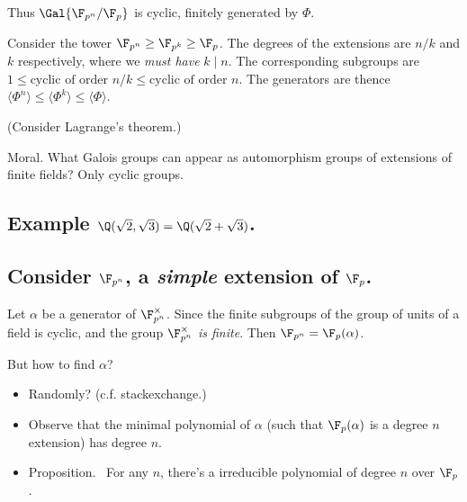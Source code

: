 Thus \(\Gal{\F_{p^n}/\F_p}\) is cyclic, finitely generated by
\(\Phi\).

Consider the tower \(\F_{p^n} \ge \F_{p^k} \ge \F_p\). The degrees of
the extensions are \(n/k\) and \(k\) respectively, where we \emph{must
have} \(k \mid n\). The corresponding subgroups are
\(1 \le \text{cyclic of order $n/k$} \le \text{cyclic of order $n$}\).
The generators are thence
\(\langle \Phi^n\rangle \le \langle \Phi^k \rangle \le \langle \Phi \rangle\).

\pf (Consider Lagrange's theorem.)

Moral. What Galois groups can appear as automorphism groups of
extensions of finite fields? Only cyclic groups.

\hypertarget{example-qqsqrt2-sqrt3-qqsqrt2-sqrt3.}{%
\subsection{\texorpdfstring{Example
\(\Q(\sqrt{2}, \sqrt{3}) = \Q(\sqrt{2} + \sqrt{3})\).}{Example \textbackslash Q(\textbackslash sqrt\{2\}, \textbackslash sqrt\{3\}) = \textbackslash Q(\textbackslash sqrt\{2\} + \textbackslash sqrt\{3\}).}}\label{example-qqsqrt2-sqrt3-qqsqrt2-sqrt3.}}

\hypertarget{consider-ff_pn-a-simple-extension-of-ff_p.}{%
\subsection{\texorpdfstring{Consider \(\F_{p^n}\), a \emph{simple
}extension of
\(\F_p\).}{Consider \textbackslash F\_\{p\^{}n\}, a simple extension of \textbackslash F\_p.}}\label{consider-ff_pn-a-simple-extension-of-ff_p.}}

\pf Let \(\alpha\) be a generator of \(\F_{p^n}^\times\). Since the
finite subgroups of the group of units of a field is cyclic, and the
group \(\F_{p^n}^\times\) \emph{is finite}. Then
\(\F_{p^n} = \F_p(\alpha)\).

But how to find \(\alpha\)?

\begin{itemize}
\item
  Randomly? (c.f. stackexchange.)
\item
  Observe that the minimal polynomial of \(\alpha\) (such that
  \(\F_p(\alpha)\) is a degree \(n\) extension) has degree \(n\).
\item
  Proposition. \TODO~For any \(n\), there's a irreducible polynomial of
  degree \(n\) over \(\F_p\).
\end{itemize}

